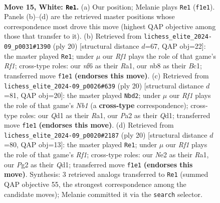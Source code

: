 \documentclass[11pt]{article}
\begin{document}
\clearpage

\begin{figure}[p]\centering
\begin{subfigure}{0.46\textwidth}\centering
\resizebox{\linewidth}{!}{%
\newchessgame
\chessboard[
  setfen={rnr3k1/1p1b1ppp/p1qbpn2/8/8/3BPN2/PP1BNPPP/R2Q1RK1 w - - 10 15},
  showmover=false,
  pgfstyle=straightmove, color=movearrow, markmove={f1-e1}
]}
\caption{}
\end{subfigure}\hfill
\begin{subfigure}{0.46\textwidth}\centering
\resizebox{\linewidth}{!}{%
\newchessgame
\chessboard[
  setfen={r1bq1rk1/pp2bppp/2p2n2/3n4/3P4/2NB1N1P/PP3PP1/R1BQ1RK1 w - - 0 11},
  showmover=false,
  pgfstyle=straightmove, color=movearrow, markmove={f1-e1}
]}
\caption{}
\end{subfigure}
\\[4pt]
\begin{subfigure}{0.46\textwidth}\centering
\resizebox{\linewidth}{!}{%
\newchessgame
\chessboard[
  setfen={r2q1rk1/pp2bpp1/2n1bn1p/2Pp4/7B/3B1N2/PPP2PPP/RN1QR1K1 w - - 1 11},
  showmover=false,
  pgfstyle=straightmove, color=movearrow, markmove={b1-d2}
]}
\caption{}
\end{subfigure}\hfill
\begin{subfigure}{0.46\textwidth}\centering
\resizebox{\linewidth}{!}{%
\newchessgame
\chessboard[
  setfen={r2q1rk1/pp2bppp/2n1bn2/3p2B1/8/2NB1N2/PPP2PPP/R2Q1RK1 w - - 6 11},
  showmover=false,
  pgfstyle=straightmove, color=movearrow, markmove={f1-e1}
]}
\caption{}
\end{subfigure}
\caption{\textbf{Move 15, White: \texttt{Re1}.} (a) Our position; Melanie plays \texttt{Re1} (\texttt{f1e1}). Panels (b)--(d) are the retrieved master positions whose correspondence most drove this move (highest QAP objective among those that transfer to it). (b) Retrieved from \texttt{lichess\_elite\_2024-09\_p0031\#1390} (ply 20) [structural distance $d$=67, QAP obj=22]: the master played \texttt{Re1}; under $\mu$ our \emph{Rf1} plays the role of that game's \emph{Rf1}; cross-type roles: our \emph{n}f6 as their \emph{R}a1, our \emph{n}b8 as their \emph{B}c1; transferred move \texttt{f1e1} \textbf{(endorses this move)}. (c) Retrieved from \texttt{lichess\_elite\_2024-09\_p0026\#639} (ply 20) [structural distance $d$=81, QAP obj=20]: the master played \texttt{Nbd2}; under $\mu$ our \emph{Rf1} plays the role of that game's \emph{Nb1} (a \textbf{cross-type} correspondence); cross-type roles: our \emph{Q}d1 as their \emph{R}a1, our \emph{P}a2 as their \emph{Q}d1; transferred move \texttt{f1e1} \textbf{(endorses this move)}. (d) Retrieved from \texttt{lichess\_elite\_2024-09\_p0020\#2187} (ply 20) [structural distance $d$=80, QAP obj=13]: the master played \texttt{Re1}; under $\mu$ our \emph{Rf1} plays the role of that game's \emph{Rf1}; cross-type roles: our \emph{N}e2 as their \emph{R}a1, our \emph{P}g2 as their \emph{Q}d1; transferred move \texttt{f1e1} \textbf{(endorses this move)}. Synthesis: 3 retrieved analogs transferred to \texttt{Re1} (summed QAP objective 55, the strongest correspondence among the candidate moves); Melanie committed it via the \texttt{search} selector.}
\label{fig:thought-m28}
\end{figure}
\end{document}
